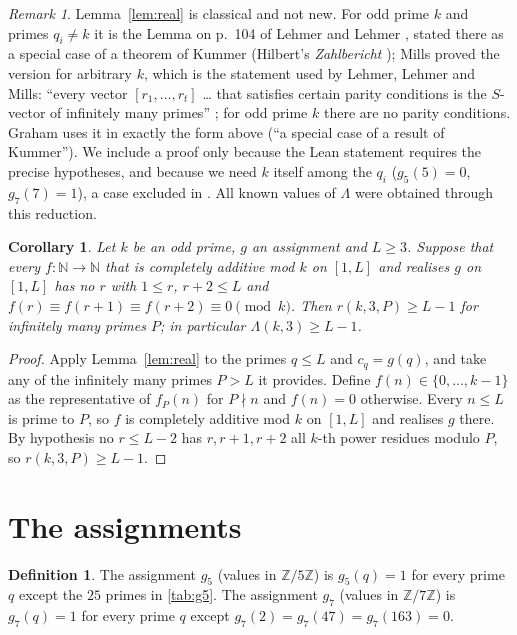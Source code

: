 \documentclass[11pt]{article}
\numberwithin{equation}{section}
\newtheorem{corollary}[theorem]{Corollary}
\theoremstyle{definition}
\newtheorem{definition}[theorem]{Definition}
\theoremstyle{remark}
\newtheorem{remark}[theorem]{Remark}
\newcommand{\Z}{\mathbb Z}
\newcommand{\N}{\mathbb N}
\begin{document}
\begin{remark}
Lemma~\ref{lem:real} is classical and not new. For odd prime $k$ and primes $q_i\ne k$ it is the
Lemma on p.~104 of Lehmer and Lehmer \cite{LeLe62}, stated there as a special case of a theorem of
Kummer (Hilbert's \emph{Zahlbericht} \cite{Hi97}); Mills \cite{Mi63} proved the version for arbitrary $k$,
which is the statement used by Lehmer, Lehmer and Mills: ``every vector $[r_1,\dots,r_t]$ \dots{} that
satisfies certain parity conditions is the $S$-vector of infinitely many primes'' \cite[p.~174]{LLM63};
for odd prime $k$ there are no parity conditions. Graham \cite{Gr64} uses it in exactly the form above
(``a special case of a result of Kummer''). We include a proof only because the Lean statement
requires the precise hypotheses, and because we need $k$ itself among the $q_i$ ($g_5(5)=0$,
$g_7(7)=1$), a case excluded in \cite{LeLe62}. All known values of $\Lambda$ were obtained through this reduction.
\end{remark}

\begin{corollary}\label{cor:transfer}
Let $k$ be an odd prime, $g$ an assignment and $L\ge3$. Suppose that every $f:\N\to\N$ that is completely
additive mod $k$ on $[1,L]$ and realises $g$ on $[1,L]$ has no $r$ with $1\le r$, $r+2\le L$ and
$f(r)\equiv f(r+1)\equiv f(r+2)\equiv0\pmod k$. Then $r(k,3,P)\ge L-1$ for infinitely many primes
$P$; in particular $\Lambda(k,3)\ge L-1$.
\end{corollary}

\begin{proof}
Apply Lemma~\ref{lem:real} to the primes $q\le L$ and $c_q=g(q)$, and take any of the infinitely many
primes $P>L$ it provides. Define $f(n)\in\{0,\dots,k-1\}$ as the representative of $f_P(n)$ for
$P\nmid n$ and $f(n)=0$ otherwise. Every $n\le L$ is prime to $P$, so $f$ is completely additive mod $k$
on $[1,L]$ and realises $g$ there. By hypothesis no $r\le L-2$ has $r,r+1,r+2$ all $k$-th power
residues modulo $P$, so $r(k,3,P)\ge L-1$.
\end{proof}

\section{The assignments}\label{sec:assign}

\begin{definition}\label{def:g}
The assignment $g_5$ (values in $\Z/5\Z$) is $g_5(q)=1$ for every prime $q$ except the $25$ primes
in \cref{tab:g5}. The assignment $g_7$ (values in $\Z/7\Z$) is $g_7(q)=1$ for every prime $q$ except
$g_7(2)=g_7(47)=g_7(163)=0$.
\end{definition}
\end{document}
